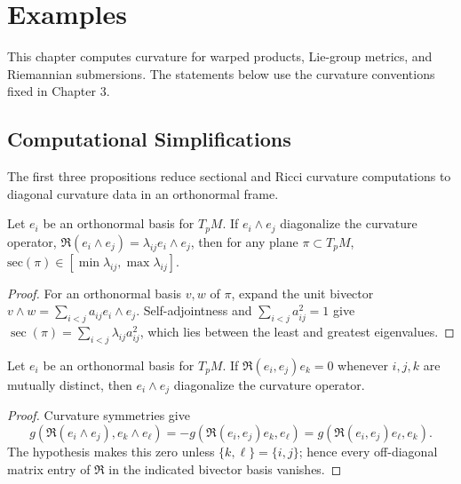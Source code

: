 \chapter{Examples}
\label{chap:pet-examples}

This chapter computes curvature for warped products, Lie-group metrics, and
Riemannian submersions. The statements below use the curvature conventions fixed
in Chapter 3.

\section{Computational Simplifications}

The first three propositions reduce sectional and Ricci curvature computations to
diagonal curvature data in an orthonormal frame.

\begin{proposition}
  \label{prop:pet-ch4-curvature-operator-diagonal-bounds}
  \leanok
  Let $e_i$ be an orthonormal basis for $T_pM$. If $e_i\wedge e_j$ diagonalize the
  curvature operator, $\mathfrak{R}(e_i\wedge e_j)=\lambda_{ij}e_i\wedge e_j$, then for any
  plane $\pi\subset T_pM$, $\mathrm{sec}(\pi)\in[\min\lambda_{ij},\max\lambda_{ij}]$.
\end{proposition}
\begin{proof}
  \leanok
  \sketch
  For an orthonormal basis $v,w$ of $\pi$, expand the unit bivector
  $v\wedge w=\sum_{i<j}a_{ij}e_i\wedge e_j$. Self-adjointness and
  $\sum_{i<j}a_{ij}^2=1$ give
  $\operatorname{sec}(\pi)=\sum_{i<j}\lambda_{ij}a_{ij}^2$, which lies between
  the least and greatest eigenvalues.
\end{proof}

\begin{proposition}
  \label{prop:pet-ch4-triple-vanishing-diagonalizes-operator}
  \leanok
  Let $e_i$ be an orthonormal basis for $T_pM$. If $\mathfrak{R}(e_i,e_j)e_k=0$ whenever
  $i,j,k$ are mutually distinct, then $e_i\wedge e_j$ diagonalize the curvature
  operator.
\end{proposition}
\begin{proof}
  \leanok
  \sketch
  Curvature symmetries give
  \[
    g(\mathfrak R(e_i\wedge e_j),e_k\wedge e_\ell)
    =-g(\mathfrak R(e_i,e_j)e_k,e_\ell)
    =g(\mathfrak R(e_i,e_j)e_\ell,e_k).
  \]
  The hypothesis makes this zero unless $\{k,\ell\}=\{i,j\}$; hence every
  off-diagonal matrix entry of $\mathfrak R$ in the indicated bivector basis
  vanishes.
\end{proof}

